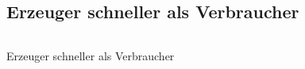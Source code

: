 \subsection{Erzeuger schneller als Verbraucher} %
\label{sub:erzeuger_schneller_als_verbraucher}
\begin{quellcode}[H]
\begin{footnotesize}
\begin{spacing}{1.0}
\inputminted[bgcolor=bg, tabsize=2, linenos]{console}{esv.txt}
\caption{Erzeuger schneller als Verbraucher}
\label{out:esv}
\end{spacing}
\end{footnotesize}
\end{quellcode}


